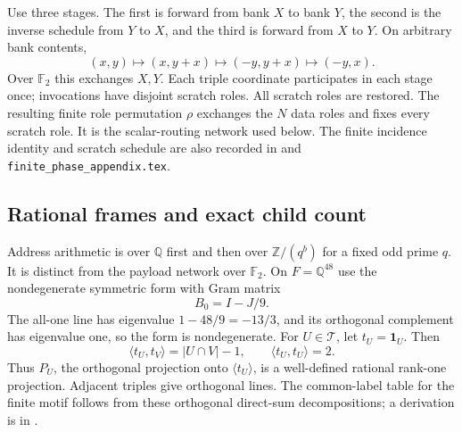 Use three stages.  The first is forward from bank $X$ to bank $Y$, the
second is the inverse schedule from $Y$ to $X$, and the third is forward
from $X$ to $Y$.  On arbitrary bank contents,
\[
 (x,y)\longmapsto(x,y+x)\longmapsto(-y,y+x)\longmapsto(-y,x).
\]
Over $\mathbb F_2$ this exchanges $X,Y$.  Each triple coordinate
participates in each stage once; invocations have disjoint scratch
roles.  All scratch roles are restored.  The resulting finite role
permutation $\rho$ exchanges the $N$ data roles and fixes every scratch
role.  It is the scalar-routing network used below.  The finite incidence
identity and scratch schedule are also recorded in
 and
\texttt{finite\_phase\_appendix.tex}.

\subsection{Rational frames and exact child count}

Address arithmetic is over $\mathbb Q$ first and then over
$\mathbb Z/(q^b)$ for a fixed odd prime $q$.  It is distinct from the
payload network over $\mathbb F_2$.  On $F=\mathbb Q^{48}$ use the
nondegenerate symmetric form with Gram matrix
\[
                         B_0=I-J/9.
\]
The all-one line has eigenvalue $1-48/9=-13/3$, and its orthogonal
complement has eigenvalue one, so the form is nondegenerate.  For
$U\in\mathcal T$, let $t_U=\mathbf1_U$.  Then
\[
 \langle t_U,t_V\rangle=|U\cap V|-1,\qquad
 \langle t_U,t_U\rangle=2.
\]
Thus $P_U$, the orthogonal projection onto $\langle t_U\rangle$, is a
well-defined rational rank-one projection.  Adjacent triples give
orthogonal lines.  The common-label table for the finite motif follows
from these orthogonal direct-sum decompositions; a derivation is in
  .

